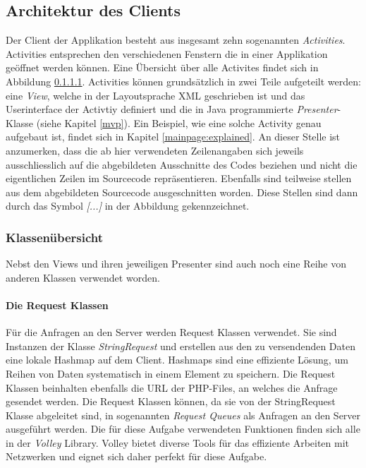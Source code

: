 \documentclass[a4paper,11pt]{report}
\begin{document}
			\subsection{Architektur des Clients} %
			Der Client der Applikation besteht aus insgesamt zehn sogenannten \emph{Activities}. Activities entsprechen den verschiedenen Fenstern die in einer Applikation geöffnet werden können. Eine Übersicht über alle Activites findet sich in Abbildung \ref{}. Activities können grundsätzlich in zwei Teile aufgeteilt werden: eine \emph{View}, welche in der Layoutsprache XML geschrieben ist und das Userinterface der Activtiy definiert und die in Java programmierte \emph{Presenter}-Klasse (siehe Kapitel \ref{mvp}). Ein Beispiel, wie eine solche Activity genau aufgebaut ist, findet sich in Kapitel \ref{mainpage:explained}. An dieser Stelle ist anzumerken, dass die ab hier verwendeten Zeilenangaben sich jeweils ausschliesslich auf die abgebildeten Ausschnitte des Codes beziehen und nicht die eigentlichen Zeilen im Sourcecode repräsentieren. Ebenfalls sind teilweise stellen aus dem abgebildeten Sourcecode ausgeschnitten worden. Diese Stellen sind dann durch das Symbol \emph{[...]} in der Abbildung gekennzeichnet.
				
				\subsubsection{Klassenübersicht} %
				Nebst den Views und ihren jeweiligen Presenter sind auch noch eine Reihe von anderen Klassen verwendet worden.
				\paragraph{Die Request Klassen}
				Für die Anfragen an den Server werden Request Klassen verwendet. Sie sind Instanzen der Klasse \emph{StringRequest} und erstellen aus den zu versendenden Daten eine lokale Hashmap auf dem Client. Hashmaps sind eine effiziente Lösung, um Reihen von Daten systematisch in einem Element zu speichern. Die Request Klassen beinhalten ebenfalls die URL der PHP-Files, an welches die Anfrage gesendet werden. Die Request Klassen können, da sie von der StringRequest Klasse abgeleitet sind, in sogenannten \emph{Request Queues}  als Anfragen an den Server ausgeführt werden. Die für diese Aufgabe verwendeten Funktionen finden sich alle in der \emph{Volley} Library. Volley bietet diverse Tools für das effiziente Arbeiten mit Netzwerken und eignet sich daher perfekt für diese Aufgabe.\cite{volley}
\end{document}
